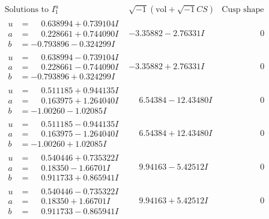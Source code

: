 \documentclass[1p]{elsarticle_modified}
\theoremstyle{definition}
\newcommand{\I}{\sqrt{-1}}
\begin{document}
$$\begin{array}{c|c|c}  
\text{Solutions to }I^u_{1}& \I (\text{vol} + \sqrt{-1}CS) & \text{Cusp shape}\\
 \hline 
\begin{aligned}
u &= \phantom{-}0.638994 + 0.739104 I \\
a &= \phantom{-}0.228661 + 0.744090 I \\
b &= -0.793896 - 0.324299 I\end{aligned}
 & -3.35882 - 2.76331 I & \phantom{-0.000000 } 0 \\ \hline\begin{aligned}
u &= \phantom{-}0.638994 - 0.739104 I \\
a &= \phantom{-}0.228661 - 0.744090 I \\
b &= -0.793896 + 0.324299 I\end{aligned}
 & -3.35882 + 2.76331 I & \phantom{-0.000000 } 0 \\ \hline\begin{aligned}
u &= \phantom{-}0.511185 + 0.944135 I \\
a &= \phantom{-}0.163975 + 1.264040 I \\
b &= -1.00260 - 1.02085 I\end{aligned}
 & \phantom{-}6.54384 - 12.43480 I & \phantom{-0.000000 } 0 \\ \hline\begin{aligned}
u &= \phantom{-}0.511185 - 0.944135 I \\
a &= \phantom{-}0.163975 - 1.264040 I \\
b &= -1.00260 + 1.02085 I\end{aligned}
 & \phantom{-}6.54384 + 12.43480 I & \phantom{-0.000000 } 0 \\ \hline\begin{aligned}
u &= \phantom{-}0.540446 + 0.735322 I \\
a &= \phantom{-}0.18350 - 1.66701 I \\
b &= \phantom{-}0.911733 + 0.865941 I\end{aligned}
 & \phantom{-}9.94163 - 5.42512 I & \phantom{-0.000000 } 0 \\ \hline\begin{aligned}
u &= \phantom{-}0.540446 - 0.735322 I \\
a &= \phantom{-}0.18350 + 1.66701 I \\
b &= \phantom{-}0.911733 - 0.865941 I\end{aligned}
 & \phantom{-}9.94163 + 5.42512 I & \phantom{-0.000000 } 0 \\ \hline\begin{aligned}

\end{aligned}
\end{array}$$
\end{document}
